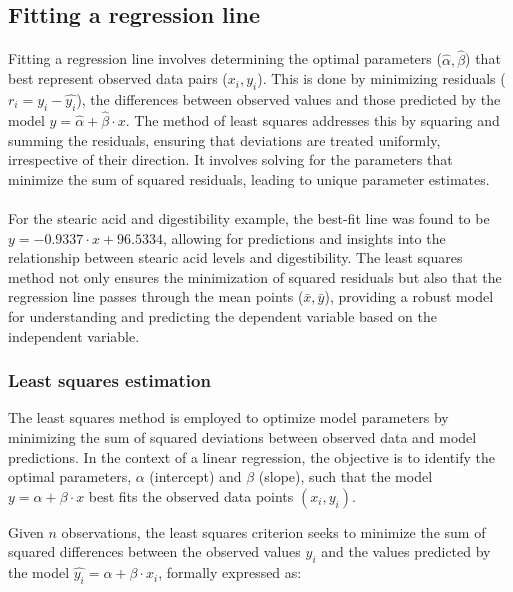 \documentclass{article}
\begin{document}
\subsection{Fitting a regression line}
\paragraph{}
Fitting a regression line involves determining the optimal parameters (\( \hat{\alpha}, \hat{\beta} \)) that best represent observed data pairs (\(x_i, y_i\)). This is done by minimizing residuals (\(r_i = y_i - \hat{y_i}\)), the differences between observed values and those predicted by the model \(y = \hat{\alpha} + \hat{\beta} \cdot x\). The method of least squares addresses this by squaring and summing the residuals, ensuring that deviations are treated uniformly, irrespective of their direction. It involves solving for the parameters that minimize the sum of squared residuals, leading to unique parameter estimates.
\paragraph{}
For the stearic acid and digestibility example, the best-fit line was found to be \(y = -0.9337 \cdot x + 96.5334\), allowing for predictions and insights into the relationship between stearic acid levels and digestibility. The least squares method not only ensures the minimization of squared residuals but also that the regression line passes through the mean points (\(\bar{x}, \bar{y}\)), providing a robust model for understanding and predicting the dependent variable based on the independent variable.

\subsubsection{Least squares estimation}
The least squares method is employed to optimize model parameters by minimizing the sum of squared deviations between observed data and model predictions. In the context of a linear regression, the objective is to identify the optimal parameters, \( \alpha \) (intercept) and \( \beta \) (slope), such that the model \( y = \alpha + \beta \cdot x \) best fits the observed data points \( (x_i, y_i) \).

Given \( n \) observations, the least squares criterion seeks to minimize the sum of squared differences between the observed values \( y_i \) and the values predicted by the model \( \hat{y_i} = \alpha + \beta \cdot x_i \), formally expressed as:
\end{document}
